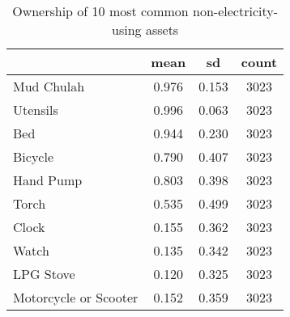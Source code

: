 \begin{table}[htbp]\centering
\def\sym#1{\ifmmode^{#1}\else\(^{#1}\)\fi}
\caption{Ownership of 10 most common non-electricity-using assets \label{tab:"label"}}
\begin{tabular*}{0.9\hsize}{@{\hskip\tabcolsep\extracolsep\fill}l*{1}{ccc}}
\toprule
                                &     mean&       sd&    count\\
\midrule
Mud Chulah                      &    0.976&    0.153&     3023\\
Utensils                        &    0.996&    0.063&     3023\\
Bed                             &    0.944&    0.230&     3023\\
Bicycle                         &    0.790&    0.407&     3023\\
Hand Pump                       &    0.803&    0.398&     3023\\
Torch                           &    0.535&    0.499&     3023\\
Clock                           &    0.155&    0.362&     3023\\
Watch                           &    0.135&    0.342&     3023\\
LPG Stove                       &    0.120&    0.325&     3023\\
Motorcycle or Scooter           &    0.152&    0.359&     3023\\
\bottomrule
\end{tabular*}
\end{table}
